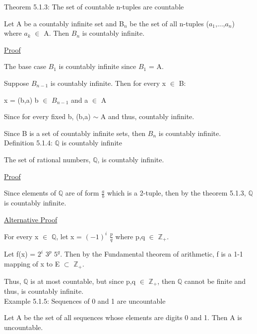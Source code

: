 { \color{red} Theorem 5.1.3: The set of countable n-tuples are countable } 

	\begin{adjustbox}{minipage=14cm, right, vspace=0.1cm 0cm}
		Let A be a countably infinite set and B$_n$ be the set of all
		n-tuples ($a_1$,...,$a_n$) where $a_k$ $\in$ A.
		Then $B_n$ is countably infinite.
	\end{adjustbox}

{ \color{magenta} \underline{Proof} } 
	
	The base case $B_1$ is countably infinite since $B_1$ = A.

	Suppose $B_{n-1}$ is countably infinite. Then for every x $\in$ B:

	\qquad x = (b,a) \qquad \qquad b $\in$ $B_{n-1}$ and a $\in$ A

	Since for every fixed b, (b,a) $\sim$ A and thus, countably infinite.

	Since B is a set of countably infinite sets, then $B_{n}$
	is countably infinite. \\

{ \color{blue} Definition 5.1.4: $\mathbb{Q}$ is countably infinite } 

	\begin{adjustbox}{minipage=14cm, right, vspace=0.1cm 0cm}
		The set of rational numbers, $\mathbb{Q}$, is countably infinite.
	\end{adjustbox}

{ \color{magenta} \underline{Proof} } 
	
	Since elements of $\mathbb{Q}$ are of form $\frac{a}{b}$ which is a
	2-tuple, then by the {\color{red} theorem 5.1.3}, $\mathbb{Q}$ is countably infinite.

{ \color{magenta} \underline{Alternative Proof} } 
	
	For every x $\in$ $\mathbb{Q}$, let x = $(-1)^i$ $\frac{p}{q}$ where p,q $\in$ $\mathbb{Z}_+$.

	Let f(x) = $2^i$ $3^p$ $5^q$. Then by the Fundamental theorem of arithmetic,
	f is a 1-1 mapping of x to E $\subset$ $\mathbb{Z}_+$.

	Thus, $\mathbb{Q}$ is at most countable, but since p,q $\in$ $\mathbb{Z}_+$,
	then $\mathbb{Q}$ cannot be finite and thus, is countably infinite. \\

{ \color{purple} Example 5.1.5: Sequences of 0 and 1 are uncountable } 

	\begin{adjustbox}{minipage=14cm, right, vspace=0.1cm 0cm}
		Let A be the set of all sequences whose elements are digits 0 and 1.
		Then A is uncountable.
	\end{adjustbox}

